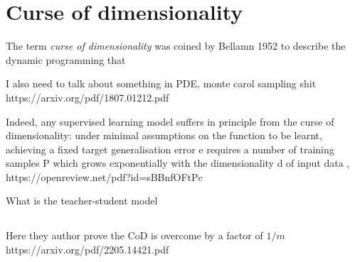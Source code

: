 





\chapter{Curse of dimensionality}

The term \textit{curse of dimensionality} was coined by Bellamn 1952 to describe
the dynamic programming that 

I also need to talk about something in PDE, monte carol sampling shit https://arxiv.org/pdf/1807.01212.pdf

Indeed, any supervised learning model suffers in principle from the curse of
dimensionality: under minimal assumptions on the function to be learnt,
achieving a fixed target generalisation error e requires a number of training
samples P which grows exponentially with the dimensionality d of input data ,
 https://openreview.net/pdf?id=sBBnfOFtPc

What is the teacher-student model

\section{}

Here they author prove the CoD is overcome by a factor of $1/m$
https://arxiv.org/pdf/2205.14421.pdf

